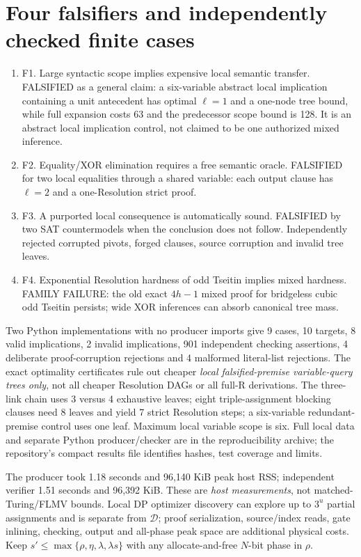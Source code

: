 \documentclass[11pt]{article}
\begin{document}
\section*{Four falsifiers and independently checked finite cases}
\begin{enumerate}
\item[] F1. Large syntactic scope implies expensive local semantic transfer. FALSIFIED as a general claim: a six-variable abstract local implication containing a unit antecedent has optimal $\ell=1$ and a one-node tree bound, while full expansion costs 63 and the predecessor scope bound is 128. It is an abstract local implication control, not claimed to be one authorized mixed inference.
\item[] F2. Equality/XOR elimination requires a free semantic oracle. FALSIFIED for two local equalities through a shared variable: each output clause has $\ell=2$ and a one-Resolution strict proof.
\item[] F3. A purported local consequence is automatically sound. FALSIFIED by two SAT countermodels when the conclusion does not follow. Independently rejected corrupted pivots, forged clauses, source corruption and invalid tree leaves.
\item[] F4. Exponential Resolution hardness of odd Tseitin implies mixed hardness. FAMILY FAILURE: the old exact $4h-1$ mixed proof for bridgeless cubic odd Tseitin persists; wide XOR inferences can absorb canonical tree mass.
\end{enumerate}
Two Python implementations with no producer imports give 9 cases, 10 targets, 8 valid implications, 2 invalid implications, 901 independent checking assertions, 4 deliberate proof-corruption rejections and 4 malformed literal-list rejections. The exact optimality certificates rule out cheaper \emph{local falsified-premise variable-query trees only}, not all cheaper Resolution DAGs or all full-R derivations. The three-link chain uses 3 versus 4 exhaustive leaves; eight triple-assignment blocking clauses need 8 leaves and yield 7 strict Resolution steps; a six-variable redundant-premise control uses one leaf. Maximum local variable scope is six. Full local data and separate Python producer/checker are in the reproducibility archive; the repository's compact results file identifies hashes, test coverage and limits.

The producer took 1.18 seconds and 96,140 KiB peak host RSS; independent verifier 1.51 seconds and 96,392 KiB. These are \emph{host measurements}, not matched-Turing/FLMV bounds. Local DP optimizer discovery can explore up to $3^u$ partial assignments and is separate from $\mathcal D$; proof serialization, source/index reads, gate inlining, checking, output and all-phase peak space are additional physical costs. Keep $s'\le\max\{\rho,\eta,\lambda,\lambda s\}$ with any allocate-and-free $N$-bit phase in $\rho$.
\end{document}
